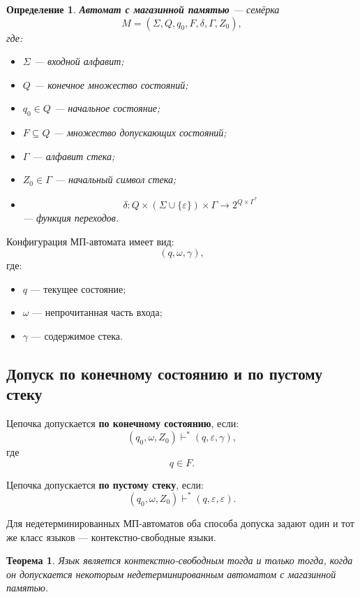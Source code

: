 \documentclass[12pt,a4paper]{article}
\newtheorem{definition}{Определение}
\newtheorem{theorem}{Теорема}
\newcommand{\eps}{\varepsilon}
\begin{document}
\begin{definition}
\textbf{Автомат с магазинной памятью} --- семёрка
\[
M=(\Sigma,Q,q_0,F,\delta,\Gamma,Z_0),
\]
где:
\begin{itemize}
    \item $\Sigma$ --- входной алфавит;
    \item $Q$ --- конечное множество состояний;
    \item $q_0\in Q$ --- начальное состояние;
    \item $F\subseteq Q$ --- множество допускающих состояний;
    \item $\Gamma$ --- алфавит стека;
    \item $Z_0\in\Gamma$ --- начальный символ стека;
    \item
    \[
    \delta:Q\times(\Sigma\cup\{\eps\})\times\Gamma
    \to 2^{Q\times\Gamma^*}
    \]
    --- функция переходов.
\end{itemize}
\end{definition}

Конфигурация МП-автомата имеет вид:
\[
(q,\omega,\gamma),
\]
где:
\begin{itemize}
    \item $q$ --- текущее состояние;
    \item $\omega$ --- непрочитанная часть входа;
    \item $\gamma$ --- содержимое стека.
\end{itemize}

\subsection{Допуск по конечному состоянию и по пустому стеку}

Цепочка допускается \textbf{по конечному состоянию}, если:
\[
(q_0,\omega,Z_0)\vdash^*(q,\eps,\gamma),
\]
где
\[
q\in F.
\]

Цепочка допускается \textbf{по пустому стеку}, если:
\[
(q_0,\omega,Z_0)\vdash^*(q,\eps,\eps).
\]

Для недетерминированных МП-автоматов оба способа допуска задают один и тот же класс языков --- контекстно-свободные языки.

\begin{theorem}
Язык является контекстно-свободным тогда и только тогда, когда он допускается некоторым недетерминированным автоматом с магазинной памятью.
\end{theorem}
\end{document}
